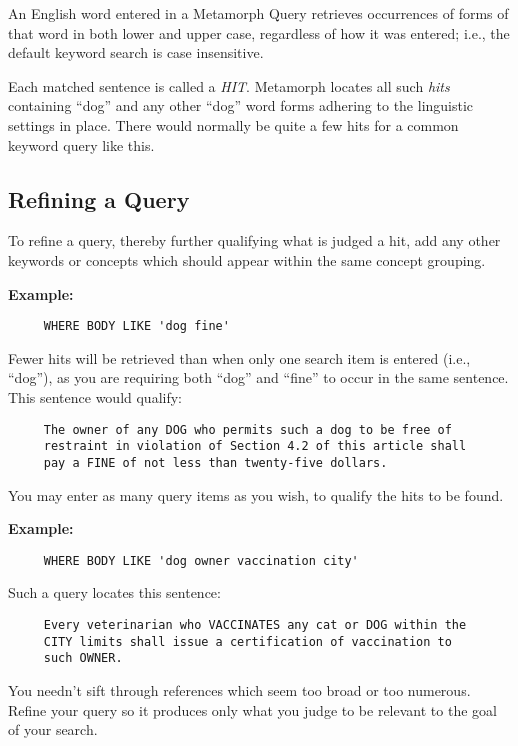 An English word entered in a Metamorph Query retrieves occurrences of
forms of that word in both lower and upper case, regardless of how it
was entered; i.e., the default keyword search is case insensitive.

Each matched sentence is called a {\em HIT}.  Metamorph locates all such
{\em hits} containing ``dog'' and any other ``dog'' word forms adhering to
the linguistic settings in place.  There would normally be quite a few
hits for a common keyword query like this.

\subsection{Refining a Query}

To refine a query, thereby further qualifying what is judged a hit,
add any other keywords or concepts which should appear within the same
concept grouping.

{\bf Example:}
\begin{verbatim}
     WHERE BODY LIKE 'dog fine'
\end{verbatim}

Fewer hits will be retrieved than when only one search item is entered
(i.e., ``dog''), as you are requiring both ``dog'' and ``fine'' to
occur in the same sentence.  This sentence would qualify:

\begin{verbatim}
     The owner of any DOG who permits such a dog to be free of
     restraint in violation of Section 4.2 of this article shall
     pay a FINE of not less than twenty-five dollars.
\end{verbatim}

You may enter as many query items as you wish, to qualify the hits to
be found.

{\bf Example:}
\begin{verbatim}
     WHERE BODY LIKE 'dog owner vaccination city'
\end{verbatim}

Such a query locates this sentence:

\begin{verbatim}
     Every veterinarian who VACCINATES any cat or DOG within the
     CITY limits shall issue a certification of vaccination to
     such OWNER.
\end{verbatim}

You needn't sift through references which seem too broad or too
numerous.  Refine your query so it produces only what you judge to be
relevant to the goal of your search.

